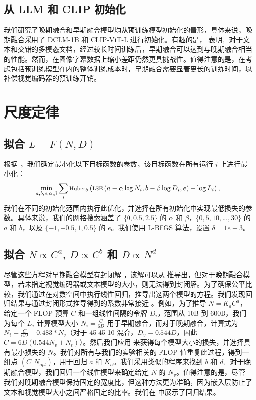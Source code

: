 \subsection{从 LLM 和 CLIP 初始化}
\label{sec:app_init_early_late}

我们研究了晚期融合和早期融合模型均从预训练模型初始化的情形，具体来说，晚期融合采用了 DCLM-1B \citep{li2024datacomp} 和 CLIP-ViT-L \citep{radford2021learning} 进行初始化。有趣的是， 表明，对于文本和交错的多模态文档，经过较长时间训练后，早期融合可以达到与晚期融合相当的性能。然而，在图像字幕数据上缩小差距仍然更具挑战性。值得注意的是，在考虑包括预训练模型在内的整体训练成本时，早期融合需要显著更长的训练时间，以补偿视觉编码器的预训练开销。


\section{尺度定律}
\label{app:scaling_laws}

\subsection{拟合 \(L = F(N, D)\)}
根据 \citep{hoffmann2022training}，我们确定最小化以下目标函数的参数，该目标函数在所有运行 \(i\) 上进行最小化：
\begin{equation}
\footnotesize
    \min_{a,b,e,\alpha,\beta} \sum_{i} \text{Huber}_\delta \left( \text{LSE} \left( a - \alpha \log N_i, b - \beta \log D_i, e \right) - \log L_i \right),
\end{equation}
我们在不同的初始化范围内执行此优化，并选择在所有初始化中实现最低损失的参数。具体来说，我们的网格搜索涵盖了 \(\{0, 0.5, 2.5\}\) 的 \(\alpha\) 和 \(\beta\)，\(\{0, 5, 10, ..., 30\}\) 的 \(a\) 和 \(b\)，以及 \(\{-1, -0.5, 1, 0.5\}\) 的 \(e\)。我们使用 L-BFGS 算法，设置 \(\delta=1e-3\)。
\subsection{拟合 \(N \propto C^a\), \(D \propto C^b\) 和 \(D \propto N^d\)}
尽管这些方程对早期融合模型有封闭解 \citep{hoffmann2022training}，该解可以从  推导出，但对于晚期融合模型，若未指定视觉编码器或文本模型的大小，则无法得到封闭解。为了确保公平比较，我们通过在对数空间中执行线性回归，推导出这两个模型的方程。我们发现回归结果与通过封闭形式推导得到的系数非常接近 。例如，为了推导 \(N = K_aC^a\)，给定一个 FLOP 预算 \(C\) 和一组线性间隔的令牌 \(D_i\)，范围从 10B 到 600B，我们为每个 \(D_i\) 计算模型大小 \(N_i = \frac{C}{6D}\) 用于早期融合，而对于晚期融合，计算式为 \(N_i = \frac{C}{6D}+0.483*N_v\)（对于 45-45-10 混合，\(D_v=0.544D\)，因此 \(C=6D(0.544N_v+N_t)\)）。然后我们应用  来获得每个模型大小的损失，并选择具有最小损失的 \(N\)。我们对所有与我们的实验相关的 FLOP 值重复此过程，得到一组点 \((C, N_{opt})\)，用于回归 \(a\) 和 \(K_a\)。我们采用类似的程序来找到 \(b\) 和 \(d\)。对于晚期融合模型，我们回归一个线性模型来确定给定 \(N\) 的 \(N_v\)。值得注意的是，尽管我们对晚期融合模型保持固定的宽度比，但这种方法更为准确，因为嵌入层防止了文本和视觉模型大小之间严格固定的比率。我们在  中展示了回归结果。

